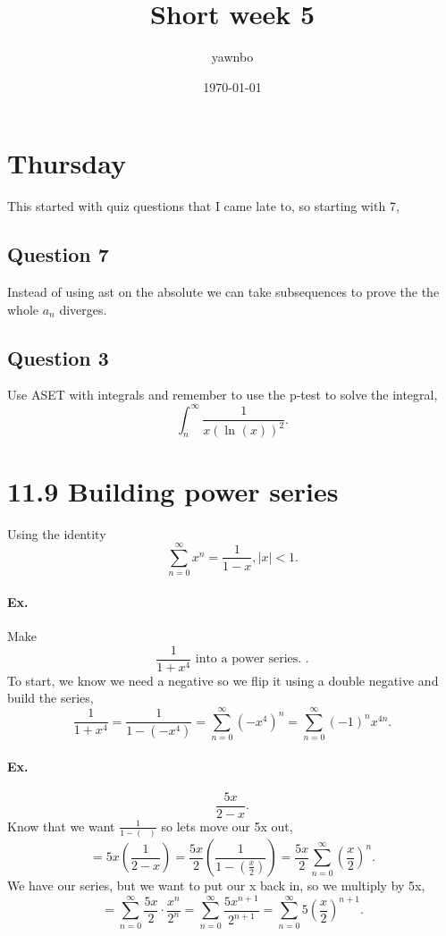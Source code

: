 \documentclass[a4paper]{article}
\title{Short week 5}
\author{yawnbo}
\date{\today}
\begin{document}
\maketitle
\section*{Thursday}%
\label{sec:Thursday}
This started with quiz questions that I came late to, so starting with 7, 
\subsection*{Question 7}%
\label{sub:Question 7}
Instead of using ast on the absolute we can take subsequences to prove the the whole $ a_n $ diverges. 

\subsection*{Question 3}%
\label{sub:Question 3}
Use ASET with integrals and remember to use the p-test to solve the integral,
\[
\int_{ n }^{ \infty } \frac{ 1 }{ x\left( \ln^{  } \left( x \right)  \right) ^2 } 
.\] 

\section*{11.9 Building power series}%
\label{sec:Building power series}
Using the identity
\[
\sum_{ n=0 } ^{ \infty } x^{ n } = \frac{ 1 }{ 1-x } , \left| x \right| < 1
.\] 
\paragraph{Ex.}
Make 
\[
\frac{ 1 }{ 1+x^{ 4 } } \text{ into a power series. }
.\] 
To start, we know we need a negative so we flip it using a double negative and build the series,
\[
\frac{ 1 }{ 1+x^{ 4 } } = \frac{ 1 }{ 1- \left( -x^{ 4 } \right) } = \sum_{ n=0 } ^{ \infty } \left( -x^{ 4 } \right) ^{ n } = \sum_{ n=0 } ^{ \infty } \left( -1 \right) ^{ n } x^{ 4n }
.\] 
\paragraph{Ex.}
\[
\frac{ 5x }{ 2-x } 
.\] 
Know that we want $ \frac{ 1 }{ 1-\left( \text{  } \right)  }  $ so lets move our 5x out,
\[
=5x\left( \frac{ 1 }{ 2-x }  \right) = \frac{ 5x }{ 2 } \left( \frac{ 1 }{ 1-\left( \frac{ x }{ 2 }  \right)  }  \right) = \frac{ 5x }{ 2 } \sum_{ n=0 } ^{ \infty } \left( \frac{ x }{ 2 }  \right) ^{ n }
.\] 
We have our series, but we want to put our x back in, so we multiply by 5x,
\[
=\sum_{ n=0 } ^{ \infty } \frac{ 5x }{ 2 } \cdot \frac{ x^{ n } }{ 2^{ n } }= \sum_{ n=0 } ^{ \infty } \frac{ 5x^{ n+1 } }{ 2^{ n+1 } }= \sum_{ n=0 } ^{ \infty } 5\left( \frac{ x }{ 2 }  \right) ^{ n+1 }
.\] 
\end{document}
